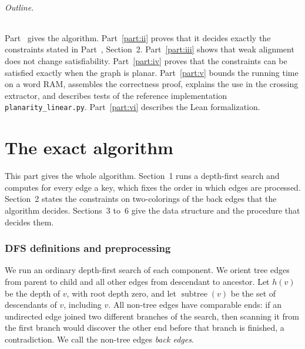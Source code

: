 \documentclass[11pt]{article}
\DeclareMathOperator{\subtree}{subtree}
\begin{document}
\paragraph{Outline.}
Part~\ref{part:i} gives the algorithm. Part~\ref{part:ii} proves that it
decides exactly the constraints stated in Part~\ref{part:i}, Section~2.
Part~\ref{part:iii} shows that weak alignment does not change satisfiability.
Part~\ref{part:iv} proves that the constraints can be satisfied exactly when
the graph is planar. Part~\ref{part:v} bounds the running time on a word RAM,
assembles the correctness proof, explains the use in the crossing extractor,
and describes tests of the reference implementation
\texttt{planarity\_linear.py}. Part~\ref{part:vi} describes the Lean
formalization.

\part{The exact algorithm}\label{part:i}

This part gives the whole algorithm. Section~1 runs a depth-first search and
computes for every edge a key, which fixes the order in which edges are
processed. Section~2 states the constraints on two-colorings of the back edges
that the algorithm decides. Sections~3 to~6 give the data structure and the
procedure that decides them.

\section{DFS definitions and preprocessing}

We run an ordinary depth-first search of each component. We orient tree edges
from parent to child and all other edges from descendant to ancestor. Let
$h(v)$ be the depth of $v$, with root depth zero, and let $\subtree(v)$ be the
set of descendants of $v$, including $v$. All non-tree edges have comparable
ends: if an undirected edge joined two different branches of the search, then
scanning it from the first branch would discover the other end before that
branch is finished, a contradiction. We call the non-tree edges \emph{back
edges}.
\end{document}
